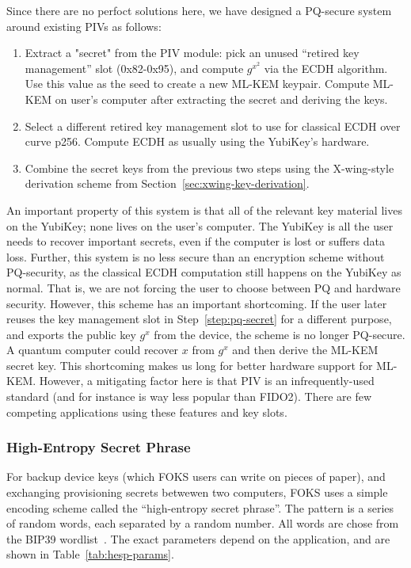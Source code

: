 Since there are no perfoct solutions here, we have designed a PQ-secure system
around existing PIVs as follows:

\begin{enumerate}
  \item Extract a "secret" from the PIV module: pick an unused ``retired key management'' slot
  (0x82-0x95), and compute $g^{x^2}$ via the ECDH algorithm. Use this value as the seed
  to create a new ML-KEM keypair. Compute ML-KEM on user's computer after extracting the secret
  and deriving the keys.
  \label{step:pq-secret}

  \item Select a different retired key management slot to use for classical ECDH over curve p256.
  Compute ECDH as usually using the YubiKey's hardware.

  \item  Combine the secret keys from the previous two steps using the X-wing-style
  derivation scheme from Section~\ref{sec:xwing-key-derivation}.
\end{enumerate}

An important property of this system is that all of the relevant key material
lives on the YubiKey; none lives on the user's computer. The YubiKey is all the
user needs to recover important secrets, even if the computer is lost or suffers
data loss. Further, this system is no less secure than an encryption scheme
without PQ-security, as the classical ECDH computation still happens on the
YubiKey as normal. That is, we are not forcing the user to choose between PQ and
hardware security.  However, this scheme has an important shortcoming. If the
user later reuses the key management slot in Step~\ref{step:pq-secret} for a
different purpose, and exports the public key $g^x$ from the device, the scheme
is no longer PQ-secure.  A quantum computer could recover $x$ from $g^x$ and
then derive the ML-KEM secret key.  This shortcoming makes us long for better
hardware support for ML-KEM.  However, a mitigating factor here is that PIV is
an infrequently-used standard (and for instance is way less popular than FIDO2).
There are few competing applications using these features and key slots.

\subsubsection{High-Entropy Secret Phrase}
\label{sec:hesp}

For backup device keys (which FOKS users can write on pieces of paper), and 
exchanging provisioning secrets betwewen two computers, FOKS uses a simple
encoding scheme called the ``high-entropy secret phrase''. The pattern is 
a series of random words, each separated by a random number. All
words are chose from the BIP39 wordlist~\cite{bip39}. The exact
parameters depend on the application, and are shown in Table~\ref{tab:hesp-params}.

